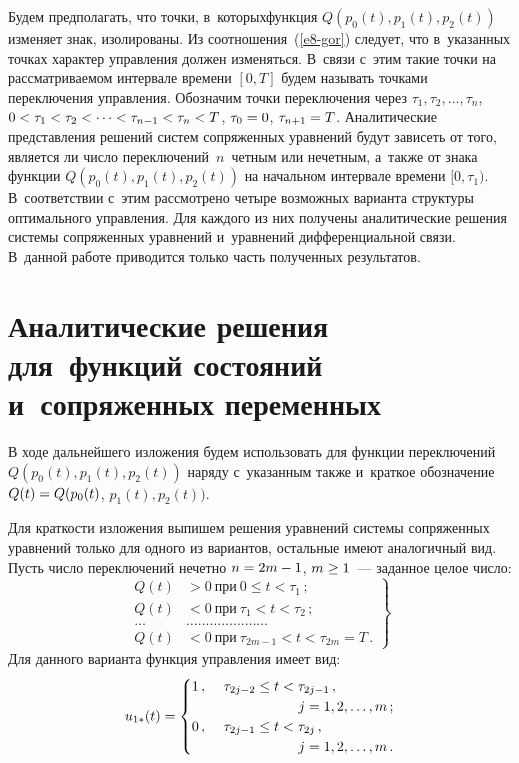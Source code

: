 \begin{multicols}{2}
Будем предполагать, что точки, в~которых\linebreak функция $Q(p_0(t),p_1(t),p_2(t))$ 
изменяет знак, изолированы. Из соотношения~(\ref{e8-gor}) следует, что в~указанных 
точках характер управ\-ле\-ния должен \mbox{изменяться}. В~связи с~этим такие точки на 
рас\-смат\-ри\-ва\-емом интервале времени $[0,T]$ будем называть точками переключения 
управления. Обозначим точки переключения через $\tau_1,\tau_2,\ldots,\tau_n$, 
$0\hm<\tau_1\hm<\tau_2<\cdots<\tau_{n-1}\hm<\tau_n\hm<T$, $\tau_0\hm=0$, 
$\tau_{n+1}\hm=T$. Аналитические представления решений систем сопряженных уравнений 
будут зависеть от того, является ли число переключений~$n$~четным или нечетным, 
а~также от знака функции $Q(p_0(t),p_1(t),p_2(t))$ на начальном интервале времени 
$[0,\tau_1)$. В~соответствии с~этим рассмотрено четыре возможных варианта структуры 
оптимального управления. Для каждого из них получены аналитические решения системы 
сопряженных уравнений и~уравнений дифференциальной связи. 
В~данной работе приводится только часть полученных результатов.

\section{Аналитические решения для~функций состояний и~сопряженных переменных}

В ходе дальнейшего изложения будем использовать для функции переключений
$Q(p_0(t),p_1(t),p_2(t))$ наряду с~указанным также и~краткое обозначение 
$Q(t)\hm=Q(p_0(t)$, $p_1(t),p_2(t))$.

 Для краткости изложения выпишем решения уравнений системы сопряженных 
 уравнений только для одного из вариантов, остальные имеют аналогичный вид. 
 Пусть число переключений нечетно $n\hm=2m\hm-1$, $m \hm\geq 1$~--- 
 заданное целое число:
\begin{equation} 
\left.
\begin{array}{rl}
Q(t)&>0 \ \mbox{при} \ 0 \leq t < \tau_1\,; \\[6pt]
Q(t)&<0 \ \mbox{при} \ \tau_1 < t < \tau_2\,;\\[6pt]
\ldots&\ldots\ldots\ldots\ldots\ldots\ldots\ldots\\[6pt]
Q(t)&<0 \ \mbox{при} \ \tau_{2m-1} < t < \tau_{2m}=T\,.
\end{array}
\right\}
\label{e9-gor}
\end{equation}
Для данного варианта функция управления имеет вид:
\begin{equation}
u_{1*}(t)=
\begin{cases}
1\,, &\  \tau_{2j-2} \leq t < \tau_{2j-1}\,,\\
&\hspace*{20mm} j=1,2,\ldots,m\,;
\\
0\,, &\ \tau_{2j-1}\leq t< \tau_{2j}\,, \\
&\hspace*{20mm} j=1,2,\ldots,m\,.
\end{cases}
\label{e10-gor}
\end{equation}


\end{multicols}
